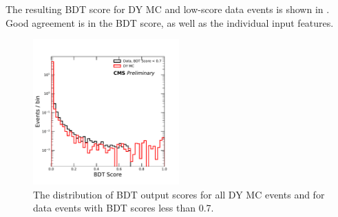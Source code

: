 The resulting BDT score for DY MC and low-score data events is shown in .
Good agreement is in the BDT score, as well as the individual input features.

\begin{figure}[htbp]
	\label{fig:BDTlowvalid}
	\centering
	\includegraphics[width=0.5\textwidth]{figures/partialBDTScore.pdf}
        \caption[Low BDT Score Validation]{The distribution of BDT output scores for all DY MC events and for data events with BDT scores less than 0.7.}
\end{figure}

